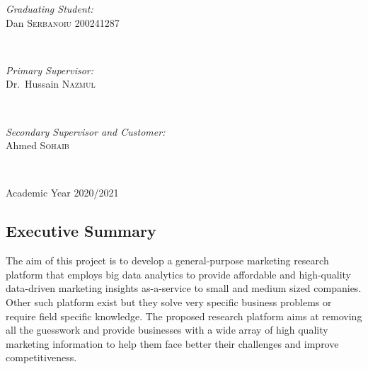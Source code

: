 \begin{titlepage}
	
	\begin{minipage}{0.4\textwidth}
		\begin{flushleft} \large
			\emph{Graduating Student:} \\
			Dan \textsc{Serbanoiu} 200241287
		\end{flushleft}
	\end{minipage}
	~
	\begin{minipage}{0.4\textwidth}
		\begin{flushright} \large
			\emph{Primary Supervisor:}\\
			Dr.~Hussain \textsc{Nazmul} 
		\end{flushright}
	\end{minipage}\\[0.5cm]
	\begin{minipage}{0.8\textwidth}
		\begin{flushright} \large
			\emph{Secondary Supervisor and Customer:}\\
			Ahmed \textsc{Sohaib} 
		\end{flushright}
	\end{minipage}\\[0.5cm]

	\noindent\makebox[\linewidth]{\rule{\paperwidth}{0.2pt}}

	
	{\LARGE Academic Year 2020/2021\par}
\end{titlepage}




\vspace{1cm}
\begin{changemargin}{2.5cm}{2.5cm} 
	\section*{Executive Summary}
	\thispagestyle{empty}
	The aim of this project is to develop a general-purpose marketing research platform that employs big data analytics to provide affordable and high-quality data-driven marketing insights as-a-service to small and medium sized companies. Other such platform exist but they solve very specific business problems or require field specific knowledge. The proposed research platform aims at removing all the guesswork and provide businesses with a wide array of high quality marketing information to help them face better their challenges and improve competitiveness. 
\end{changemargin}
\clearpage


